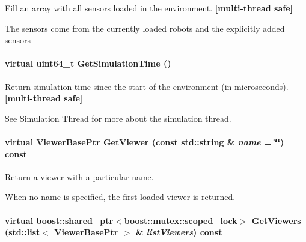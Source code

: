 Fill an array with all sensors loaded in the environment. {\bfseries \mbox{[}multi-\/thread safe\mbox{]}} 

The sensors come from the currently loaded robots and the explicitly added sensors \hypertarget{classOpenRAVE_1_1EnvironmentBase_aa9b102e35855f8dfd216e282e179fe3c}{
\paragraph[{GetSimulationTime}]{\setlength{\rightskip}{0pt plus 5cm}virtual uint64\_\-t GetSimulationTime ()}\hfill}
\label{classOpenRAVE_1_1EnvironmentBase_aa9b102e35855f8dfd216e282e179fe3c}


Return simulation time since the start of the environment (in microseconds). {\bfseries \mbox{[}multi-\/thread safe\mbox{]}} 

See \hyperlink{architecture__concepts_arch_simulation}{Simulation Thread} for more about the simulation thread. \hypertarget{classOpenRAVE_1_1EnvironmentBase_a422dc0ce03020fb713107d287510af83}{
\paragraph[{GetViewer}]{\setlength{\rightskip}{0pt plus 5cm}virtual ViewerBasePtr GetViewer (const std::string \& {\em name} = {\ttfamily \char`\"{}\char`\"{}}) const}\hfill}
\label{classOpenRAVE_1_1EnvironmentBase_a422dc0ce03020fb713107d287510af83}


Return a viewer with a particular name. 

When no name is specified, the first loaded viewer is returned. \hypertarget{classOpenRAVE_1_1EnvironmentBase_aaabc93c6dca5c4a1362b20bddb5d1e14}{
\paragraph[{GetViewers}]{\setlength{\rightskip}{0pt plus 5cm}virtual boost::shared\_\-ptr$<$boost::mutex::scoped\_\-lock$>$ GetViewers (std::list$<$ ViewerBasePtr $>$ \& {\em listViewers}) const}\hfill}
\label{classOpenRAVE_1_1EnvironmentBase_aaabc93c6dca5c4a1362b20bddb5d1e14}


